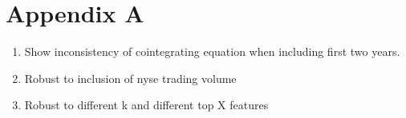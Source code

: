\chapter{Appendix A\label{apndxA}}

\begin{enumerate}
  \item Show inconsistency of cointegrating equation when including first two years.
  \item Robust to inclusion of nyse trading volume
  \item Robust to different k and different top X features
\end{enumerate}

